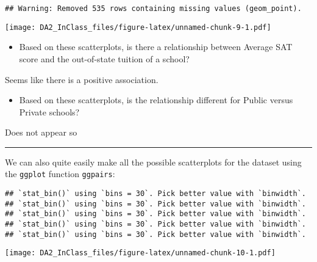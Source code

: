 \documentclass[]{article}
\newenvironment{Shaded}{\begin{snugshade}}{\end{snugshade}}
\newcommand{\KeywordTok}[1]{\textcolor[rgb]{0.13,0.29,0.53}{\textbf{#1}}}
\newcommand{\NormalTok}[1]{#1}
\newcommand{\OperatorTok}[1]{\textcolor[rgb]{0.81,0.36,0.00}{\textbf{#1}}}
\newcommand{\StringTok}[1]{\textcolor[rgb]{0.31,0.60,0.02}{#1}}
\providecommand{\tightlist}{%
  \setlength{\itemsep}{0pt}\setlength{\parskip}{0pt}}
\begin{document}
\begin{verbatim}
## Warning: Removed 535 rows containing missing values (geom_point).
\end{verbatim}

\texttt{[image: DA2\_InClass\_files/figure-latex/unnamed-chunk-9-1.pdf]}

\begin{itemize}
\tightlist
\item
  Based on these scatterplots, is there a relationship between Average
  SAT score and the out-of-state tuition of a school?
\end{itemize}

Seems like there is a positive association.

\begin{itemize}
\tightlist
\item
  Based on these scatterplots, is the relationship different for Public
  versus Private schools?
\end{itemize}

Does not appear so

\begin{center}\rule{0.5\linewidth}{\linethickness}\end{center}

We can also quite easily make all the possible scatterplots for the
dataset using the \texttt{ggplot} function \texttt{ggpairs}:

\begin{Shaded}
\end{Shaded}

\begin{verbatim}
## `stat_bin()` using `bins = 30`. Pick better value with `binwidth`.
## `stat_bin()` using `bins = 30`. Pick better value with `binwidth`.
## `stat_bin()` using `bins = 30`. Pick better value with `binwidth`.
## `stat_bin()` using `bins = 30`. Pick better value with `binwidth`.
## `stat_bin()` using `bins = 30`. Pick better value with `binwidth`.
\end{verbatim}

\texttt{[image: DA2\_InClass\_files/figure-latex/unnamed-chunk-10-1.pdf]}
\end{document}
